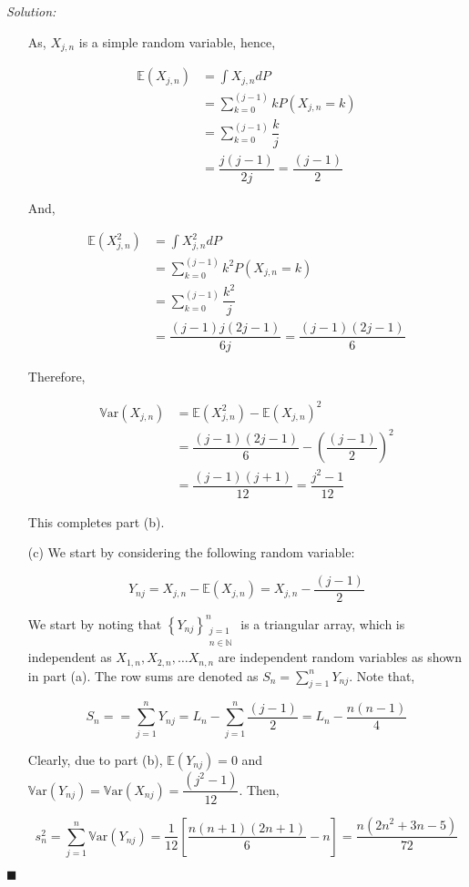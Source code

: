 \documentclass[12pt]{article}
\newcommand{\N}{\mathbb{N}}
\newcommand{\E}{\mathbb{E}}
\newcommand{\Var}{\mathbb{V}\text{ar}}
\theoremstyle{definition}
\newenvironment{answer}{\textit{Solution: }\quad }{ \hfill $\blacksquare$}
\begin{document}
\begin{answer}
\begin{enumerate}
		As, $X_{j,n}$ is a simple random variable, hence, 

		\begin{align*}
			\E(X_{j, n})
			& = \int X_{j, n}dP\\
			& = \sum_{k = 0}^{(j-1)} k P(X_{j, n} = k)\\
			& = \sum_{k = 0}^{(j-1)} \dfrac{k}{j} \\
			& = \dfrac{j(j-1)}{2j} = \dfrac{(j-1)}{2}
		\end{align*}

		And,

		\begin{align*}
			\E(X_{j, n}^2)
			& = \int X_{j, n}^2 dP\\
			& = \sum_{k = 0}^{(j-1)} k^2 P(X_{j, n} = k)\\
			& = \sum_{k = 0}^{(j-1)} \dfrac{k^2}{j} \\
			& = \dfrac{(j-1)j(2j-1)}{6j} = \dfrac{(j-1)(2j-1)}{6}
		\end{align*}

		Therefore, 

		\begin{align*}
			\Var(X_{j,n}) & = \E(X_{j,n}^2) - \E(X_{j,n})^2 \\
			& = \dfrac{(j-1)(2j-1)}{6} - \left( \dfrac{(j-1)}{2} \right)^2\\
			& = \dfrac{(j-1)(j+1)}{12} = \dfrac{j^2 - 1}{12}
		\end{align*}

		This completes part (b).

		\item[(c)] We start by considering the following random variable:
		
		$$Y_{nj} = X_{j, n} - \E(X_{j,n}) = X_{j,n} - \dfrac{(j-1)}{2}$$ 
		
		We start by noting that $\left\{ Y_{nj} \right\}_{\substack{j=1\\n \in \N}}^{n}$ is a triangular array, which is independent as $X_{1, n}, X_{2,n}, \dots X_{n, n}$ are independent random variables as shown in part (a). The row sums are denoted as $S_n = \sum_{j = 1}^{n} Y_{nj}$. Note that,

		$$S_n = = \sum_{j = 1}^{n} Y_{nj} = L_n - \sum_{j=1}^{n} \dfrac{(j-1)}{2} = L_n - \dfrac{n(n-1)}{4}$$

		Clearly, due to part (b), $\E(Y_{nj}) = 0$ and $\Var(Y_{nj}) = \Var(X_{nj}) = \dfrac{(j^2 - 1)}{12}$. Then, 

		$$s_n^2 = \sum_{j=1}^{n} \Var(Y_{nj}) = \dfrac{1}{12} \left[ \dfrac{n(n+1)(2n+1)}{6} - n \right] = \dfrac{n(2n^2 + 3n - 5)}{72}$$


\end{enumerate}
\end{answer}
\end{document}
